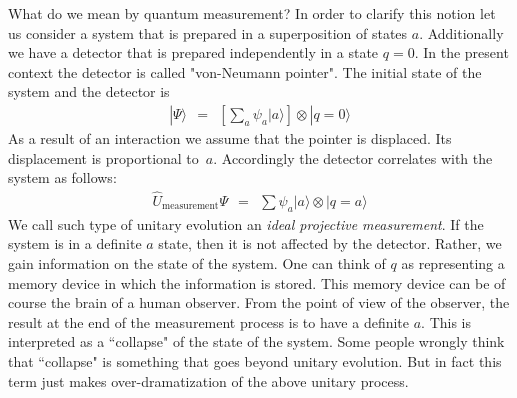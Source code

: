 \documentclass[onecolumn,fleqn, 11pt]{revtex4}
\newcommand{\tbox}[1]{\text{#1}}
\newcommand{\beq}{\begin{eqnarray}}
\newcommand{\eeq}{\end{eqnarray}}
\begin{document}
What do we mean by quantum measurement? In order to 
clarify this notion let us consider a system that is prepared 
in a superposition of states $a$. Additionally we have 
a detector that is prepared  independently in a state $q{=}0$. 
In the present context the detector is called "von-Neumann pointer". 
The initial state of the system and the detector is  
\beq
|\Psi\rangle \ \ = \ \ \left[ \sum_a \psi_a |a\rangle \right] \otimes | q=0 \rangle 
\eeq
As a result of an interaction we assume that 
the pointer is displaced. Its displacement 
is proportional to~$a$. Accordingly the  
detector correlates with the system as follows:
\beq
\hat{U}_{\tbox{measurement}}\Psi \ \ = \ \ \sum\psi_a |a\rangle  \otimes  | q=a \rangle 
\eeq
We call such type of unitary evolution an {\em ideal projective measurement}. 
If the system is in a definite $a$ state, then it is not 
affected by the detector. Rather, we gain information on 
the state of the system. One can think of $q$ as representing 
a memory device in which the information is stored.
This memory device can be of course the brain of a human 
observer. From the point of view of the observer, 
the result at the end of the measurement process 
is to have a definite $a$.  This is interpreted 
as a ``collapse" of the state of the system. Some people 
wrongly think that ``collapse" is something that goes 
beyond unitary evolution. But in fact this term just 
makes over-dramatization of the above unitary process. 
    
\end{document}
